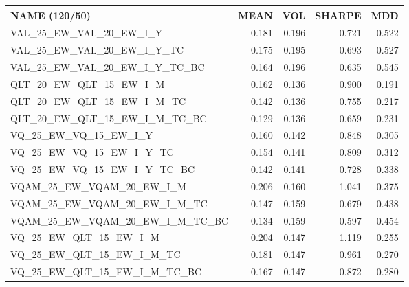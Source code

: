 \begin{tabular}{lrrrr}
\toprule
NAME (120/50) & MEAN & VOL & SHARPE & MDD \\
\midrule
VAL\_25\_EW\_VAL\_20\_EW\_I\_Y & 0.181 & 0.196 & 0.721 & 0.522 \\
VAL\_25\_EW\_VAL\_20\_EW\_I\_Y\_TC & 0.175 & 0.195 & 0.693 & 0.527 \\
VAL\_25\_EW\_VAL\_20\_EW\_I\_Y\_TC\_BC & 0.164 & 0.196 & 0.635 & 0.545 \\
QLT\_20\_EW\_QLT\_15\_EW\_I\_M & 0.162 & 0.136 & 0.900 & 0.191 \\
QLT\_20\_EW\_QLT\_15\_EW\_I\_M\_TC & 0.142 & 0.136 & 0.755 & 0.217 \\
QLT\_20\_EW\_QLT\_15\_EW\_I\_M\_TC\_BC & 0.129 & 0.136 & 0.659 & 0.231 \\
VQ\_25\_EW\_VQ\_15\_EW\_I\_Y & 0.160 & 0.142 & 0.848 & 0.305 \\
VQ\_25\_EW\_VQ\_15\_EW\_I\_Y\_TC & 0.154 & 0.141 & 0.809 & 0.312 \\
VQ\_25\_EW\_VQ\_15\_EW\_I\_Y\_TC\_BC & 0.142 & 0.141 & 0.728 & 0.338 \\
VQAM\_25\_EW\_VQAM\_20\_EW\_I\_M & 0.206 & 0.160 & 1.041 & 0.375 \\
VQAM\_25\_EW\_VQAM\_20\_EW\_I\_M\_TC & 0.147 & 0.159 & 0.679 & 0.438 \\
VQAM\_25\_EW\_VQAM\_20\_EW\_I\_M\_TC\_BC & 0.134 & 0.159 & 0.597 & 0.454 \\
VQ\_25\_EW\_QLT\_15\_EW\_I\_M & 0.204 & 0.147 & 1.119 & 0.255 \\
VQ\_25\_EW\_QLT\_15\_EW\_I\_M\_TC & 0.181 & 0.147 & 0.961 & 0.270 \\
VQ\_25\_EW\_QLT\_15\_EW\_I\_M\_TC\_BC & 0.167 & 0.147 & 0.872 & 0.280 \\
\bottomrule
\end{tabular}
